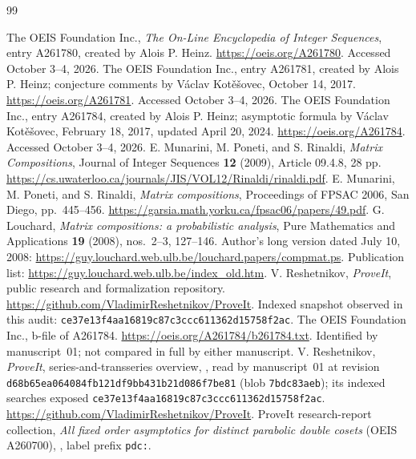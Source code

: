 \documentclass[11pt]{article}
\numberwithin{equation}{section}
\theoremstyle{definition}
\theoremstyle{remark}
\begin{document}
\begin{thebibliography}{99}
\raggedright
{} The OEIS Foundation Inc., \emph{The On-Line Encyclopedia of
Integer Sequences}, entry A261780, created by Alois P. Heinz.
\url{https://oeis.org/A261780}. Accessed October 3--4, 2026.
 The OEIS Foundation Inc., entry A261781, created by
Alois P. Heinz; conjecture comments by V\'aclav Kot\v{e}\v{s}ovec,
October 14, 2017. \url{https://oeis.org/A261781}.
Accessed October 3--4, 2026.
 The OEIS Foundation Inc., entry A261784, created by
Alois P. Heinz; asymptotic formula by V\'aclav Kot\v{e}\v{s}ovec,
February 18, 2017, updated April 20, 2024.
\url{https://oeis.org/A261784}. Accessed October 3--4, 2026.
 E. Munarini, M. Poneti, and S. Rinaldi,
\emph{Matrix Compositions}, Journal of Integer Sequences \textbf{12}
(2009), Article 09.4.8, 28 pp.
\url{https://cs.uwaterloo.ca/journals/JIS/VOL12/Rinaldi/rinaldi.pdf}.
 E. Munarini, M. Poneti, and S. Rinaldi,
\emph{Matrix compositions}, Proceedings of FPSAC 2006, San Diego,
pp.~445--456. \url{https://garsia.math.yorku.ca/fpsac06/papers/49.pdf}.
 G. Louchard, \emph{Matrix compositions: a probabilistic
analysis}, Pure Mathematics and Applications \textbf{19} (2008),
nos.~2--3, 127--146. Author's long version dated July 10, 2008:
\url{https://guy.louchard.web.ulb.be/louchard.papers/compmat.ps}.
Publication list: \url{https://guy.louchard.web.ulb.be/index_old.htm}.
 V. Reshetnikov, \emph{ProveIt}, public research and
formalization repository. \url{https://github.com/VladimirReshetnikov/ProveIt}.
Indexed snapshot observed in this audit:
\texttt{ce37e13f4aa16819c87c3ccc611362d15758f2ac}.
 The OEIS Foundation Inc., b-file of A261784.
\url{https://oeis.org/A261784/b261784.txt}. Identified by manuscript~01;
not compared in full by either manuscript.
 V. Reshetnikov, \emph{ProveIt}, series-and-transseries
overview, ,
read by manuscript~01 at revision
\texttt{d68b65ea064084fb121df9bb431b21d086f7be81} (blob
\texttt{7bdc83aeb}); its indexed searches exposed
\texttt{ce37e13f4aa16819c87c3ccc611362d15758f2ac}.
\url{https://github.com/VladimirReshetnikov/ProveIt}.
 ProveIt research-report collection, \emph{All fixed order
asymptotics for distinct parabolic double cosets} (OEIS A260700),
,
label prefix \texttt{pdc:}.

\end{thebibliography}
\end{document}

